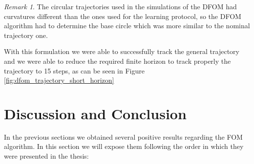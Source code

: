 \documentclass[12,twoside]{TFG-GM}
\theoremstyle{definition}
\theoremstyle{remark}
\newtheorem{remark}[theorem]{Remark}
\begin{document}
\begin{remark}
The circular trajectories used in the simulations of the DFOM had curvatures different than the ones used for the learning protocol, so the DFOM algorithm had to determine the base circle which was more similar to the nominal trajectory one.
\end{remark}

With this formulation we were able to successfully track the general trajectory and we were able to reduce the required finite horizon to track properly the trajectory to 15 steps, as can be seen in Figure \ref{fig:dfom_trajectory_short_horizon}

\section{Discussion and Conclusion}
\label{sec:conclusion}
In the previous sections we obtained several positive results regarding the FOM algorithm. In this section we will expose them following the order in which they were presented in the thesis:
\end{document}
